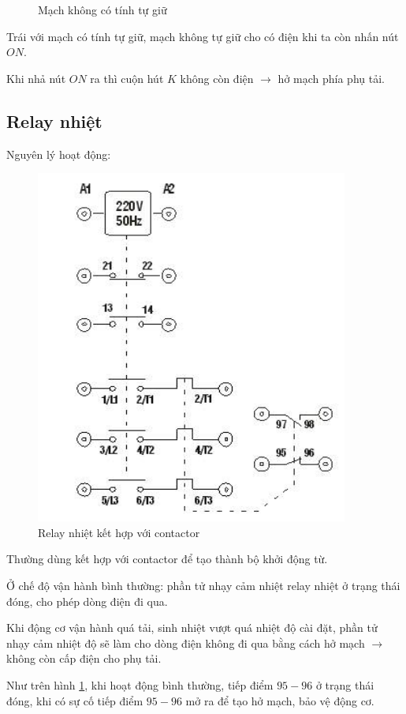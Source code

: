 \documentclass[13pt,a4paper]{extarticle}
\begin{document}
\begin{list}{--}{}
\begin{figure}[!h]
\begin{center}
\end{center}
\caption{Mạch không có tính tự giữ}
\end{figure}
\begin{list}{+}{}
\item Trái với mạch có tính tự giữ, mạch không tự giữ cho có điện khi ta còn nhấn nút $ON$.
\item Khi nhả nút $ON$ ra thì cuộn hút $K$ không còn điện $\rightarrow$ hở mạch phía phụ tải.
\end{list}
\end{list}
\subsection{Relay nhiệt}
Nguyên lý hoạt động:
\begin{figure}[!h]
\begin{center}
\includegraphics[scale=.7]{relay-temp-1}
\end{center}
\caption{Relay nhiệt kết hợp với contactor}\label{con+relay}
\end{figure}
\begin{list}{--}{}
\item Thường dùng kết hợp với contactor để tạo thành bộ khởi động từ.
\item Ở chế độ vận hành bình thường: phần tử nhạy cảm nhiệt relay nhiệt ở trạng thái đóng, cho phép dòng điện đi qua.
\item Khi động cơ vận hành quá tải, sinh nhiệt vượt quá nhiệt độ cài đặt, phần tử nhạy cảm nhiệt độ sẽ làm cho dòng điện không đi qua bằng cách hở mạch $\rightarrow$ không còn cấp điện cho phụ tải.
\item Như trên hình \ref{con+relay}, khi hoạt động bình thường, tiếp điểm $95-96$ ở trạng thái đóng, khi có sự cố tiếp điểm $95-96$ mở ra để tạo hở mạch, bảo vệ động cơ.
\end{list}
\end{document}
